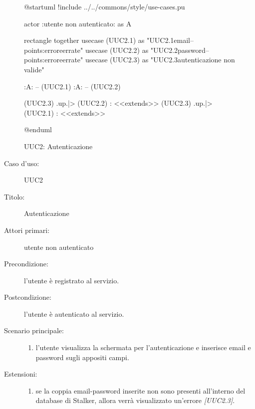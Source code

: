 \documentclass[../../../analisi-dei-requisiti.tex]{subfiles}
\begin{document}
\begin{figure}[H]
  \centering
  \begin{plantuml}
  @startuml
  !include ../../commons/style/use-cases.pu

  actor :utente non autenticato: as A

  rectangle {
    together {
      usecase (UUC2.1) as "UUC2.1\nInserimento email\n--\nExtension points:\nVisualizzazione errore\ncredenziali errate"
      usecase (UUC2.2) as "UUC2.2\nInserimento password\n--\nExtension points:\nVisualizzazione errore\ncredenziali errate"
      usecase (UUC2.3) as "UUC2.3\nInformazioni autenticazione non valide"
    }
  }

  :A: -- (UUC2.1)
  :A: -- (UUC2.2)

  (UUC2.3) .up.|> (UUC2.2) : <<extends>>
  (UUC2.3) .up.|> (UUC2.1) : <<extends>>

  @enduml
  \end{plantuml}
  \caption{UUC2: Autenticazione}
  \label{fig:uuc2}
\end{figure}

\begin{description}
  \item[Caso d’uso:] UUC2
  \item[Titolo:] Autenticazione
  \item[Attori primari:] utente non autenticato
  \item[Precondizione:] l'utente è registrato al servizio.
  \item[Postcondizione:] l'utente è autenticato al servizio.
  \item[Scenario principale:]
  \begin{enumerate}
    \item l'utente visualizza la schermata per l'autenticazione e inserisce email e password sugli appositi campi.
  \end{enumerate}
  \item[Estensioni:]
  \begin{enumerate}
    \item se la coppia email-password inserite non sono presenti all'interno del database di Stalker, allora verrà visualizzato un'errore \emph{[UUC2.3]}.
  \end{enumerate}
\end{description}
\end{document}

